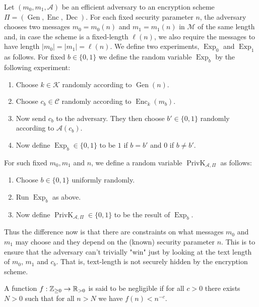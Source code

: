 \documentclass[twoside, a4paper, 10pt]{amsart}
\begin{document}
\begin{mydef} Let $(m_0, m_1,\mathcal{A})$ be an efficient adversary to an encryption scheme $\Pi = (\operatorname{Gen}, \operatorname{Enc}, \operatorname{Dec})$. For each fixed security parameter $n$, the adversary chooses two messages $m_0 = m_0(n)$ and $m_1 = m_1(n)$ in $\mathcal{M}$ of the same length and, in case the scheme is a fixed-length $\ell(n)$, we also require the messages to have length $|m_0| = |m_1| = \ell(n)$. We define two experiments, $\operatorname{Exp}_0$ and $\operatorname{Exp}_1$ as follows. For fixed $b \in \{0,1\}$ we define the random variable $\operatorname{Exp}_b$ by the following experiment:

\begin{enumerate}
	\item Choose $k \in \mathcal{K}$ randomly according to $\operatorname{Gen}(n)$.
	\item Choose $c_b \in \mathcal{C}$ randomly according to $\operatorname{Enc}_k(m_b)$.
	\item Now send $c_b$ to the adversary. They then choose $b' \in \{0,1\}$ randomly according to $\mathcal{A}( c_b)$.
	\item Now define $\operatorname{Exp}_b \in \{0,1\}$ to be $1$ if $b = b'$ and $0$ if $b \neq b'$.
\end{enumerate}

 For such fixed $m_0,m_1$ and $n$, we define a random variable $\operatorname{PrivK}_{\mathcal{A}, \Pi}$ as follows:

\begin{enumerate}
	\item Choose $b \in \{0,1\}$ uniformly randomly.
	\item Run $\operatorname{Exp}_b$ as above.
	\item Now define $\operatorname{PrivK}_{\mathcal{A}, \Pi} \in \{0,1\}$ to be the result of $\operatorname{Exp}_b$.

\end{enumerate}

\end{mydef}

Thus the difference now is that there are constraints on what messages $m_0$ and $m_1$ may choose and they depend on the (known) security parameter $n$. This is to ensure that the adversary can't trivially "win" just by looking at the text length of $m_0$, $m_1$ and $c_b$. That is, text-length is not securely hidden by the encryption scheme.

\begin{mydef} A function $f:\mathbb{Z}_{\geq 0} \to \mathbb{R}_{>0}$ is said to be negligible if for all $c>0$ there exists $N>0$ such that for all $n>N$ we have $f(n) < n^{-c}$.

\end{mydef}
\end{document}

